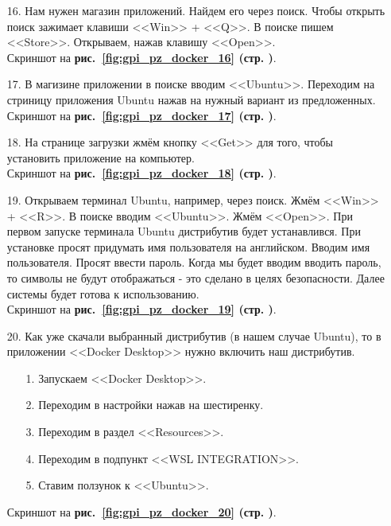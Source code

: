 \begin{itemize}
    \item[16.] Нам нужен магазин приложений. Найдем его через поиск.
    Чтобы открыть поиск зажимает клавиши <<Win>> + <<Q>>.
    В поиске пишем <<Store>>.
    Открываем, нажав клавишу <<Open>>. \\
    Скриншот на \textbf{рис.~\ref{fig:gpi_pz_docker_16} (стр. \pageref{fig:gpi_pz_docker_16})}.

    \item[17.] В магизине приложении в поиске вводим <<Ubuntu>>.
    Переходим на стриницу приложения Ubuntu нажав на нужный вариант из предложенных. \\
    Скриншот на \textbf{рис.~\ref{fig:gpi_pz_docker_17} (стр. \pageref{fig:gpi_pz_docker_17})}.

    \item[18.] На странице загрузки жмём кнопку <<Get>> для того, чтобы установить приложение на компьютер. \\
    Скриншот на \textbf{рис.~\ref{fig:gpi_pz_docker_18} (стр. \pageref{fig:gpi_pz_docker_18})}.

    \item[19.] Открываем терминал Ubuntu, например, через поиск. Жмём <<Win>> + <<R>>.
    В поиске вводим <<Ubuntu>>. Жмём <<Open>>.
    При первом запуске терминала Ubuntu дистрибутив будет устанавлився.
    При установке просят придумать имя пользователя на английском. Вводим имя пользователя.
    Просят ввести пароль.
    Когда мы будет вводим вводить пароль, то символы не будут отображаться - это сделано в целях безопасности.
    Далее системы будет готова к использованию. \\ 
    Скриншот на \textbf{рис.~\ref{fig:gpi_pz_docker_19} (стр. \pageref{fig:gpi_pz_docker_19})}.
    
    \item[20.] Как уже скачали выбранный дистрибутив (в нашем случае Ubuntu),
    то в приложении <<Docker Desktop>> нужно включить наш дистрибутив.
    \begin{itemize}
        \item[1.] Запускаем <<Docker Desktop>>.
        \item[2.] Переходим в настройки нажав на шестиренку.
        \item[3.] Переходим в раздел <<Resources>>.
        \item[4.] Переходим в подпункт <<WSL INTEGRATION>>.
        \item[5.] Ставим ползунок к <<Ubuntu>>.
    \end{itemize}
    Скриншот на \textbf{рис.~\ref{fig:gpi_pz_docker_20} (стр. \pageref{fig:gpi_pz_docker_20})}.


\end{itemize}

